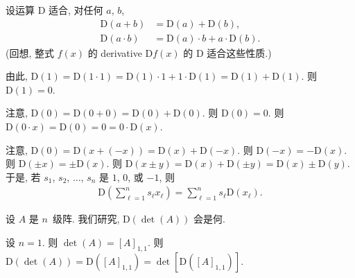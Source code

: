 \documentclass[../libro.tex]{subfiles}
\begin{document}
\begin{example}
    设运算 \(\mathrm{D}\) 适合,
    对任何 \(a\), \(b\),
    \begin{align*}
        \mathrm{D} (a + b)     & =
        \mathrm{D} (a) + \mathrm{D} (b), \\
        \mathrm{D} (a \cdot b) & =
        \mathrm{D} (a) \cdot b + a \cdot \mathrm{D} (b).
    \end{align*}
    (回想, 整式 \(f(x)\) 的 derivative \(\mathrm{D} f(x)\)
    的 \(\mathrm{D}\) 适合这些性质.)

    由此, \(\mathrm{D} (1)
        = \mathrm{D} (1 \cdot 1)
        = \mathrm{D} (1) \cdot 1 + 1 \cdot \mathrm{D} (1)
    = \mathrm{D} (1) + \mathrm{D} (1)\).
    则 \(\mathrm{D} (1) = 0\).

    注意, \(\mathrm{D} (0)
        = \mathrm{D} (0 + 0)
    = \mathrm{D} (0) + \mathrm{D} (0)\).
    则 \(\mathrm{D} (0) = 0\).
    则 \(\mathrm{D} (0 \cdot x)
    = \mathrm{D} (0) = 0 = 0 \cdot \mathrm{D} (x)\).

    注意, \(\mathrm{D} (0)
        = \mathrm{D} (x + (-x))
    = \mathrm{D} (x) + \mathrm{D} (-x)\).
    则 \(\mathrm{D} (-x) = -\mathrm{D} (x)\).
    则 \(\mathrm{D} (\pm x) = \pm \mathrm{D} (x)\).
    则 \(\mathrm{D} (x \pm y)
        = \mathrm{D} (x) + \mathrm{D} (\pm y)
    = \mathrm{D} (x) \pm \mathrm{D} (y)\).
    于是, 若 \(s_1\), \(s_2\), \(\dots\), \(s_n\)
    是 \(1\), \(0\), 或 \(-1\),
    则
    \begin{align*}
        \mathrm{D} \left(
            \sum_{\ell = 1}^{n} {s_\ell x_\ell}
        \right)
        = \sum_{\ell = 1}^{n} {s_\ell \mathrm{D} (x_\ell)}.
    \end{align*}

    设 \(A\) 是 \(n\)~级阵.
    我们研究, \(\mathrm{D} (\det {(A)})\) 会是何.

    设 \(n = 1\).
    则 \(\det {(A)} = [A]_{1,1}\).
    则 \(\mathrm{D} (\det {(A)})
        = \mathrm{D} ([A]_{1,1})
    = \det {[\mathrm{D} ([A]_{1,1})]}\).


\end{example}
\end{document}
